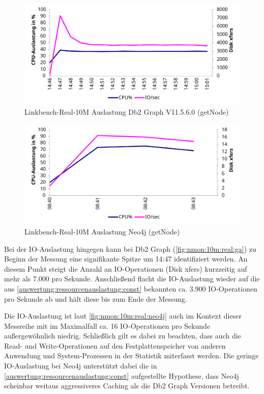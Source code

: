 \begin{figure}[!ht]
    \centering
    \includegraphics[width=\textwidth]{images/stats/linkbench-10m-real_ga.pdf}
    \caption{Linkbench-Real-10M Auslastung Db2 Graph V11.5.6.0 (getNode)}
    \label{fig:nmon:10m:real:ga}
\end{figure}

\begin{figure}[!ht]
    \centering
    \includegraphics[width=\textwidth]{images/stats/linkbench-10m-real_neo4j.pdf}
    \caption{Linkbench-Real-10M Auslastung Neo4j (getNode)}
    \label{fig:nmon:10m:real:neo4j}
\end{figure}

Bei der IO-Auslastung hingegen kann bei Db2 Graph (\autoref{fig:nmon:10m:real:ga}) zu Beginn der Messung eine signifikante Spitze um 14:47 identifiziert werden. An diesem Punkt steigt die Anzahl an IO-Operationen (Disk xfers) kurzzeitig auf mehr als 7.000 pro Sekunde. Anschließend flacht die IO-Auslastung wieder auf die aus \autoref{auswertung:ressourcenauslastung:const} bekannten ca. 3.900 IO-Operationen pro Sekunde ab und hält diese bis zum Ende der Messung.

Die IO-Auslastung ist laut \autoref{fig:nmon:10m:real:neo4j} auch im Kontext dieser Messreihe mit im Maximalfall ca. 16 IO-Operationen pro Sekunde außergewöhnlich niedrig. Schließlich gilt es dabei zu beachten, dass auch die Read- und Write-Operationen auf den Festplattenspeicher von anderen Anwendung und System-Prozessen in der Statistik miterfasst werden. Die geringe IO-Auslastung bei Neo4j unterstützt dabei die in \autoref{auswertung:ressourcenauslastung:const} aufgestellte Hypothese, dass Neo4j scheinbar weitaus aggressiveres Caching als die Db2 Graph Versionen betreibt.

